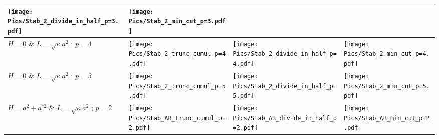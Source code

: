 \begin{landscape}
\begin{longtable}{|p{3cm}|p{7.2cm}|p{7.2cm}|p{7.2cm}|}
\begin{minipage}{7cm}
        \centering
        \texttt{[image: Pics/Stab\_2\_divide\_in\_half\_p=3.pdf]}
    \end{minipage}&
    \begin{minipage}{7cm}
        \centering
        \texttt{[image: Pics/Stab\_2\_min\_cut\_p=3.pdf]}
    \end{minipage}\\
    \hline
    $H=0$ \& $L = \sqrt{\kappa} a^2$ ; $p=4$ &
    \begin{minipage}{7cm}
        \centering
        \texttt{[image: Pics/Stab\_2\_trunc\_cumul\_p=4.pdf]}
    \end{minipage}&
    \begin{minipage}{7cm}
        \centering
        \texttt{[image: Pics/Stab\_2\_divide\_in\_half\_p=4.pdf]}
    \end{minipage}&
    \begin{minipage}{7cm}
        \centering
        \texttt{[image: Pics/Stab\_2\_min\_cut\_p=4.pdf]}
    \end{minipage}\\
    \hline
    $H=0$ \& $L = \sqrt{\kappa} a^2$ ; $p=5$ &
    \begin{minipage}{7cm}
        \centering
        \texttt{[image: Pics/Stab\_2\_trunc\_cumul\_p=5.pdf]}
    \end{minipage}&
    \begin{minipage}{7cm}
        \centering
        \texttt{[image: Pics/Stab\_2\_divide\_in\_half\_p=5.pdf]}
    \end{minipage}&
    \begin{minipage}{7cm}
        \centering
        \texttt{[image: Pics/Stab\_2\_min\_cut\_p=5.pdf]}
    \end{minipage}\\
    \hline
    \hline
    $H=a^2+a^{\dagger 2}$ \& $L = \sqrt{\kappa} a^2$ ; $p=2$ &
    \begin{minipage}{7cm}
        \centering
        \texttt{[image: Pics/Stab\_AB\_trunc\_cumul\_p=2.pdf]}
    \end{minipage}&
    \begin{minipage}{7cm}
            \centering
            \texttt{[image: Pics/Stab\_AB\_divide\_in\_half\_p=2.pdf]}
        \end{minipage}&
    \begin{minipage}{7cm}
        \centering
        \texttt{[image: Pics/Stab\_AB\_min\_cut\_p=2.pdf]}
    \end{minipage}\\
    \hline

\end{longtable}
\end{landscape}
